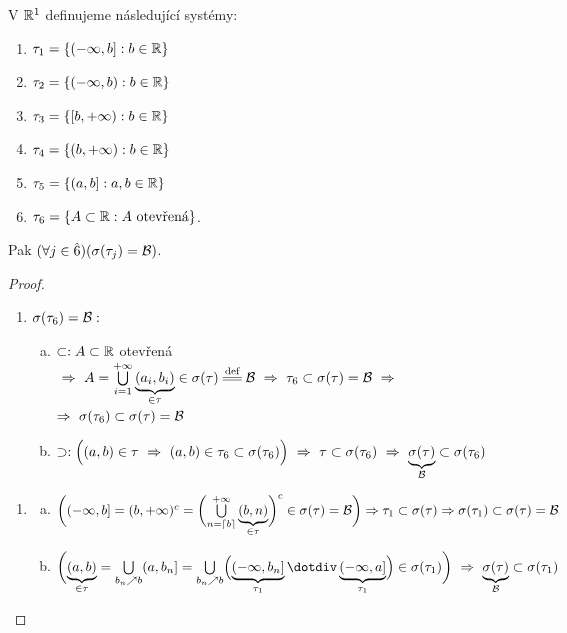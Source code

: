 \begin{theorem}
	 V $\mathbb{R}^1$ definujeme následující systémy:\begin{enumerate}[1)]
		\item $\tau_1=\{(-\infty,b]:b \in \mathbb{R}\}$
		\item $\tau_2=\{(-\infty,b):b \in \mathbb{R}\}$
	\item $\tau_3=\{[b,+\infty):b \in \mathbb{R}\}$ 
	\item $\tau_4=\{(b,+\infty):b \in \mathbb{R}\}$ 
	\item $\tau_5=\{(a,b]:a,b \in \mathbb{R}\}$ 
	\item $\tau_6=\{A \subset \mathbb{R}:A\text{ otevřená} \}$.
	\end{enumerate}
Pak $(\forall j \in \hat{6})(\sigma(\tau_j)=\mathcal{B})$.
\begin{proof}~
	\begin{enumerate}[6)]
		\item $\sigma(\tau_6)=\mathcal{B}:$  \begin{enumerate}[a)]
			\item $\subset : A\subset\mathbb{R}$ otevřená $~\Rightarrow~ A=\bigcup\limits_{i=1}^{+\infty}\underbrace{(a_i,b_i)}_{\in \tau} \in \sigma(\tau)\equal{\text{def}}\Bb ~\Rightarrow~ \tau_6\subset \sigma(\tau)=\Bb ~\Rightarrow $\newline $ \Rightarrow~ \sigma(\tau_6)\subset \sigma(\tau)=\mathcal{B}$
			\item 	$\supset: \Bigl({(a,b)\in\tau ~\Rightarrow~ (a,b) \in \tau_6 \subset\sigma(\tau_6)}\Bigr) ~\Rightarrow~ \tau\subset\sigma(\tau_6) ~\Rightarrow~\underbrace{\sigma(\tau)}_{\mathcal{B}}\subset\sigma(\tau_6)$ 
		\end{enumerate}
	\end{enumerate}
	\begin{enumerate}[1)]
		\item \begin{enumerate}[a)]
			\item $\biggl((-\infty,b] = (b,+\infty)^c=\biggl(\bigcup\limits_{n = \lceil b\rceil}^{+\infty}\underbrace{(b,n)}_{\in \tau}\biggr)^c \in \sigma(\tau)=\mathcal{B}\biggr) \Rightarrow \tau_1 \subset \sigma(\tau) \Rightarrow \sigma(\tau_1)\subset\sigma(\tau)=\mathcal{B}$
			\item $\biggl(\underbrace{(a,b)}_{\in\tau}=\bigcup\limits_{b_n\nearrow b}(a,b_n]=\bigcup\limits_{b_n\nearrow b}\Bigl( \underbrace{(-\infty,b_n]}_{\tau_1}\dotdiv  \underbrace{(-\infty,a]}_{\tau_1} \Bigr) \in \sigma(\tau_1)\biggr) ~\Rightarrow~ \underbrace{\sigma(\tau)}_{\Bb}\subset \sigma(\tau_1)$
		\end{enumerate}
	\end{enumerate}
\end{proof}
\end{theorem}
